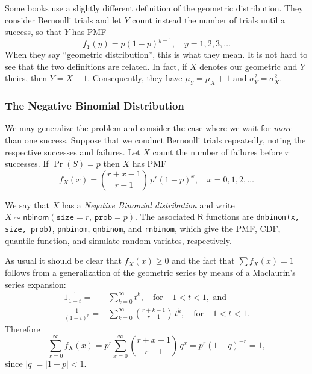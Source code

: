\documentclass[captions=tableheading]{scrbook}
\begin{document}
\begin{note}
Some books use a slightly different definition of the geometric distribution. They consider Bernoulli trials and let \(Y\) count instead the number of trials until a success, so that \(Y\) has PMF
\begin{equation}
f_{Y}(y)=p(1-p)^{y-1},\quad y=1,2,3,\ldots
\end{equation}
When they say ``geometric distribution'', this is what they mean. It is not hard to see that the two definitions are related. In fact, if \(X\) denotes our geometric and \(Y\) theirs, then \(Y=X+1\). Consequently, they have \(\mu_{Y}=\mu_{X}+1\) and \(\sigma_{Y}^{2}=\sigma_{X}^{2}\).
\end{note}
\subsubsection{The Negative Binomial Distribution}
\label{sec-5-6-2-2}
\label{sub-The-Negative-Binomial}


We may generalize the problem and consider the case where we wait for \emph{more} than one success. Suppose that we conduct Bernoulli trials repeatedly, noting the respective successes and failures. Let \(X\) count the number of failures before \(r\) successes. If \(\Pr(S)=p\) then \(X\) has PMF
\begin{equation}
f_{X}(x)={r+x-1 \choose r-1}\, p^{r}(1-p)^{x},\quad x=0,1,2,\ldots
\end{equation}

We say that \(X\) has a \emph{Negative Binomial distribution} and write \(X\sim\mathsf{nbinom}(\mathtt{size}=r,\,\mathtt{prob}=p)\). The associated \(\mathsf{R}\) functions are \texttt{dnbinom(x, size, prob)}, \texttt{pnbinom}, \texttt{qnbinom}, and \texttt{rnbinom}, which give the PMF, CDF, quantile function, and simulate random variates, respectively.

As usual it should be clear that \(f_{X}(x)\geq 0\) and the fact that \(\sum f_{X}(x)=1\) follows from a generalization of the geometric series by means of a Maclaurin's series expansion:
\begin{alignat}{1}
\frac{1}{1-t}= & \sum_{k=0}^{\infty}t^{k},\quad\mbox{for $-1<t<1$},\mbox{ and}\\
\frac{1}{(1-t)^{r}}= & \sum_{k=0}^{\infty}{r+k-1 \choose r-1}\, t^{k},\quad\mbox{for $-1<t<1$}.
\end{alignat}
Therefore
\begin{equation}
\sum_{x=0}^{\infty}f_{X}(x)=p^{r}\sum_{x=0}^{\infty}{r+x-1 \choose r-1}\, q^{x}=p^{r}(1-q)^{-r}=1,
\end{equation}
since \(|q|=|1-p|<1\). 
\end{document}
